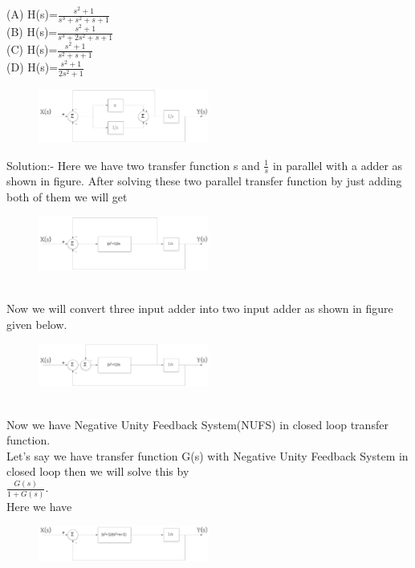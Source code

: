 \documentclass[journal,12pt,twocolumn]{IEEEtran}
\renewcommand\thesection{\arabic{section}}
\begin{document}
\begin{enumerate}[label=\arabic*.,ref=\thesection.\theenumi]
(A) H(s)=$\frac{s^2+1}{s^3+s^2+s+1}$ \\
(B) H(s)=$\frac{s^2+1}{s^3+2s^2+s+1}$ \\
(C) H(s)=$\frac{s^2+1}{s^2+s+1}$ \\
(D) H(s)=$\frac{s^2+1}{2s^2+1}$
\\
\begin{figure}[h]
\includegraphics[width=0.5\textwidth]{./figs/pic1.eps}
\end{figure}
%
{Solution:- }
Here we have two transfer function s and $\frac{1}{s}$ in parallel with a adder as shown in figure.
After solving these two parallel transfer function by just adding both of them we will get
\begin{figure}[h]
\includegraphics[width=0.5\textwidth]{./figs/pic2.eps}
\end{figure}
\\
Now we will convert three input adder into two input adder as shown in figure given below.
\begin{figure}[h]
\includegraphics[width=0.5\textwidth]{./figs/pic3.eps}
\end{figure}
\\
Now we have Negative Unity Feedback System(NUFS) in closed loop transfer function. \\Let's say we have transfer function G(s) with Negative Unity Feedback System in closed loop then we will solve this by\\              $\frac{G(s)}{1+G(s)}$.
\\Here we have
\begin{figure}[h]
\includegraphics[width=0.5\textwidth]{./figs/pic4.eps}

\end{figure}
\end{enumerate}
\end{document}
